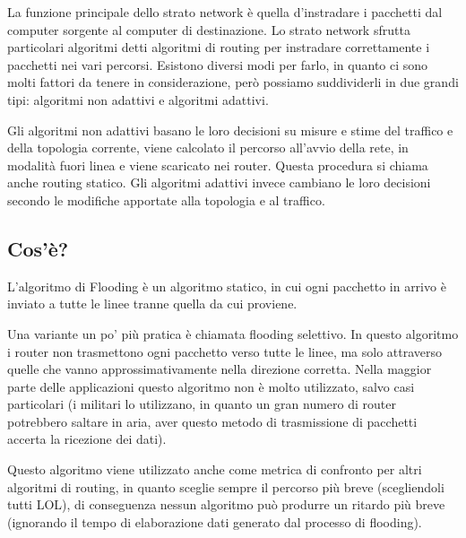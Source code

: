 La funzione principale dello strato network è quella d’instradare i pacchetti dal computer sorgente al computer di destinazione.
Lo strato network sfrutta particolari algoritmi detti algoritmi di routing per instradare correttamente i pacchetti nei vari percorsi. Esistono diversi modi per farlo, in quanto ci sono molti fattori da tenere in considerazione, però possiamo suddividerli in due grandi tipi: algoritmi non adattivi e algoritmi adattivi.

Gli algoritmi non adattivi basano le loro decisioni su misure e stime del traffico e della topologia corrente, viene calcolato il percorso all’avvio della rete, in modalità fuori linea e viene scaricato nei router. Questa procedura si chiama anche routing statico. Gli algoritmi adattivi invece cambiano le loro decisioni secondo le modifiche apportate alla topologia e al traffico.
\subsection{Cos'è?}
L’algoritmo di Flooding è un algoritmo statico, in cui ogni pacchetto in arrivo è inviato a tutte le linee tranne quella da cui proviene.

Una variante un po’ più pratica è chiamata flooding selettivo. In questo algoritmo i router non trasmettono ogni pacchetto verso tutte le linee, ma solo attraverso quelle che vanno approssimativamente nella direzione corretta.
Nella maggior parte delle applicazioni questo algoritmo non è molto utilizzato, salvo casi particolari (i militari lo utilizzano, in quanto un gran numero di router potrebbero saltare in aria, aver questo metodo di trasmissione di pacchetti accerta la ricezione dei dati).

Questo algoritmo viene utilizzato anche come metrica di confronto per altri algoritmi di routing, in quanto sceglie sempre il percorso più breve (scegliendoli tutti LOL), di conseguenza nessun algoritmo può produrre un ritardo più breve (ignorando il tempo di elaborazione dati generato dal processo di flooding).

